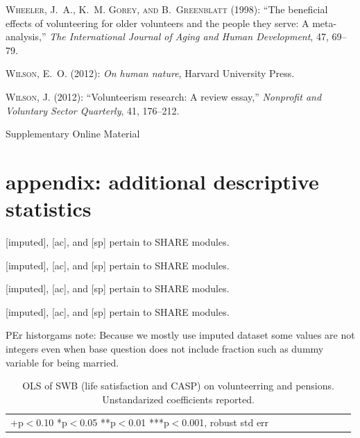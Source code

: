 \documentclass[10pt, letterpaper]{article}
\begin{document}
\begin{spacing}{1.4}
\begin{thebibliography}{71}
\textsc{Wheeler, J.~A., K.~M. Gorey, and B.~Greenblatt} (1998): \enquote{The
  beneficial effects of volunteering for older volunteers and the people they
  serve: A meta-analysis,} \emph{The International Journal of Aging and Human
  Development}, 47, 69--79.

\textsc{Wilson, E.~O.} (2012{}): \emph{On human nature}, Harvard
  University Press.

\textsc{Wilson, J.} (2012{}): \enquote{Volunteerism research: A
  review essay,} \emph{Nonprofit and Voluntary Sector Quarterly}, 41, 176--212.

\end{thebibliography}


{\huge Supplementary Online Material}

\section{appendix: additional descriptive statistics}

 
{\footnotesize [imputed], [ac], and [sp] pertain to SHARE modules.}
 
{\footnotesize [imputed], [ac], and [sp] pertain to SHARE modules.}
 
{\footnotesize [imputed], [ac], and [sp] pertain to SHARE modules.}
 
{\footnotesize [imputed], [ac], and [sp] pertain to SHARE modules.}

PEr historgams note: Because we mostly use imputed dataset some values are not integers even when base
question does not include fraction such as dummy variable for being married. 








\begin{spacing}{.9}
\begin{table}[H]\centering \caption{OLS of SWB  (life satisfaction and CASP) on
    volunteerring and pensions.  Unstandarized coefficients reported.}  \begin{scriptsize} \begin{tabular}{p{1.8in}p{.5in}p{.5in}p{.5in}p{.5in}|p{.5in}p{.5in}p{.5in}p{.5in}p{.5in}p{.4in}p{.5in}p{.4in}}\hline 
      \hline\multicolumn{5}{l}{+p$<$0.10 *p$<$0.05 **p$<$0.01 ***p$<$0.001,
        robust std err} \end{tabular}\label{regEw6w4} \end{scriptsize}\end{table}
\end{spacing}




\end{spacing}
\end{document}
